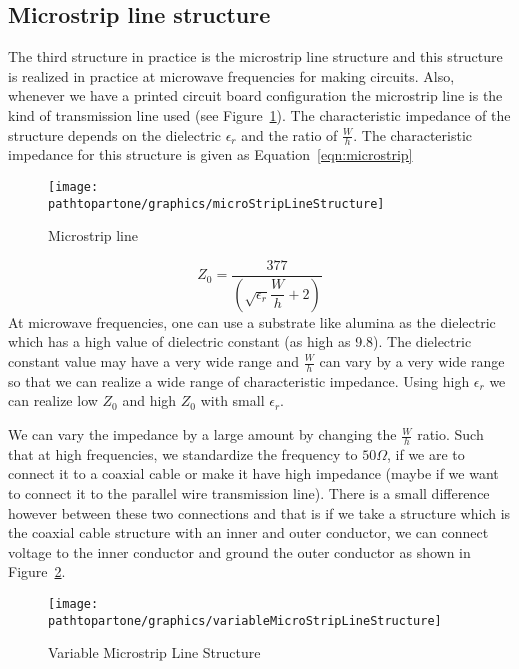 \subsection{Microstrip line structure}
The third structure in practice is the microstrip line structure and this structure is realized in practice at microwave frequencies for making circuits. Also, whenever we have a printed circuit board configuration the microstrip line is the kind of transmission line used (see Figure~\ref{fig:microstrip}). The characteristic impedance of the structure depends on the dielectric $\epsilon_{r}$ and the ratio of $\frac{W}{h}$. The characteristic impedance for this structure is given as Equation~\eqref{eqn:microstrip}
\begin{figure}[h]
\centering
\texttt{[image: \\pathtopartone/graphics/microStripLineStructure]}
\caption{Microstrip line}
\label{fig:microstrip}
\end{figure}

\begin{equation}
Z_0 =\frac{377}{\left(\sqrt{\epsilon_r}\dfrac{W}{h}+2\right)}
\label{eqn:microstrip}
\end{equation}
At microwave frequencies, one can use a substrate like alumina as the dielectric which has a high value of dielectric constant (as high as 9.8). The dielectric constant value may have a very wide range and $\frac{W}{h}$ can vary by a very wide range so that we can realize a wide range of characteristic impedance. Using high $\epsilon_r$ we can realize low $Z_0$ and high $Z_0$ with small $\epsilon_r$.

We can vary the impedance by a large amount by changing the $\frac{W}{h}$ ratio. Such that at high frequencies, we standardize the frequency to $50\varOmega$, if we are to connect it to a coaxial cable or make it have high impedance (maybe if we want to connect it to the parallel wire transmission line). There is a small difference however between these two connections and that is if we take a structure which is the coaxial cable structure with an inner and outer conductor, we can connect voltage to the inner conductor and ground the outer conductor as shown in Figure~\ref{fig:microstripvar}.
\begin{figure}[h]
\centering
\texttt{[image: \\pathtopartone/graphics/variableMicroStripLineStructure]}
\caption{Variable Microstrip Line Structure}
\label{fig:microstripvar}
\end{figure}

